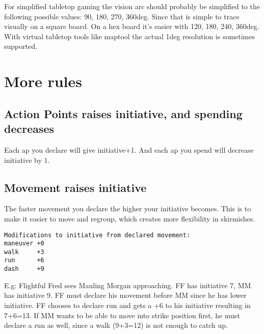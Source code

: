 For simplified tabletop gaming the vision arc should probably be simplified to the following possible values: 90, 180, 270, 360deg. Since that is simple to trace visually on a square board. On a hex board it's easier with 120, 180, 240, 360deg. With virtual tabletop tools like maptool the actual 1deg resolution is sometimes supported.









\section*{More rules}


\subsection*{Action Points raises initiative, and spending decreases}
Each ap you declare will give initiative+1. And each ap you spend will decrease initiative by 1.


\subsection*{Movement raises initiative}
The faster movement you declare the higher your initiative becomes. This is to make it easier to move and regroup, which creates more flexibility in skirmishes.

\begin{verbatim}
Modifications to initiative from declared movement:
maneuver +0
walk     +3
run      +6
dash     +9
\end{verbatim}

E.g: Flightful Fred sees Mauling Morgan approaching. FF has initiative 7, MM has initiative 9. FF must declare his movement before MM since he has lower initiative. FF chooses to declare run and gets a +6 to his initiative resulting in 7+6=13. If MM wants to be able to move into strike position first, he must declare a run as well, since a walk (9+3=12) is not enough to catch up.



